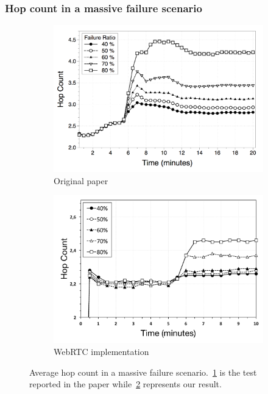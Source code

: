 \documentclass{beamer}
\begin{document}
\begin{frame}
\frametitle{Hop count in a massive failure scenario}

\begin{figure}
\centering
\begin{subfigure}{.5\textwidth}
  \centering
  \includegraphics[keepaspectratio=true, width=1\linewidth]{images/paper_average_hop_count_failures}
  \caption{Original paper}
  \label{fig:paper_average_hop_count_failures}
\end{subfigure}%
\begin{subfigure}{.5\textwidth}
  \centering
  \includegraphics[keepaspectratio=true, width=1\linewidth]{images/average_hop_count_failures_1impl}
  \caption{WebRTC implementation}
  \label{fig:average_hop_count_failures_1impl}
\end{subfigure}
\caption{Average hop count in a massive failure scenario.~\ref{fig:paper_average_hop_count_failures} is the test reported in the paper while~\ref{fig:average_hop_count_failures_1impl} represents our result.}
\label{fig:robustness_hop_count_failures}
\end{figure}

\end{frame}
\end{document}
